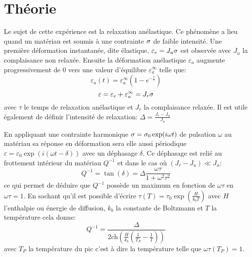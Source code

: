 \section{Théorie}

Le sujet de cette expérience est la relaxation anélastique. Ce phénomène a lieu quand un matériau est soumis à une contrainte $\sigma$ de faible intensité. Une première déformation instantanée, dite élastique, $\varepsilon_e = J_u \sigma$ est observée avec $J_u$ la complaisance non relaxée. Ensuite la déformation anélastique $\varepsilon_a$ augmente progressivement de $0$ vers une valeur d'équilibre $\varepsilon_a^\infty$ telle que:
\begin{equation}
    \varepsilon_a(t) = \varepsilon_a^\infty \left(1-e^{-\frac{t}{\tau}}\right)
\end{equation}
\begin{equation}
    \varepsilon = \varepsilon_e + \varepsilon_a^\infty = J_r \sigma
\end{equation}
avec $\tau$ le temps de relaxation anélastique et $J_r$ la complaisance relaxée. Il est utile également de définir l'intensité de relaxation: $\Delta = \frac{J_r - J_u}{J_u}$

En appliquant une contrainte harmonique $\sigma = \sigma_0 \exp(i\omega t)$ de pulsation $\omega$ au matériau sa réponse en déformation sera elle aussi périodique $\varepsilon = \varepsilon_0\exp(i(\omega t - \delta))$ avec un déphasage $\delta$. Ce déphasage est relié au frottement intérieur du matériau $Q^{-1}$ et dans le cas où $(J_r - J_u) \ll J_u$:
\begin{equation}
    Q^{-1} = \tan(\delta) = \Delta\frac{\omega\tau}{1+\omega^2\tau^2}
\end{equation}
ce qui permet de déduire que $Q^{-1}$ possède un maximum en fonction de $\omega\tau$ en $\omega\tau = 1$. En sachant qu'il est possible d'écrire $\tau(T) = \tau_0 \exp(\frac{H}{k_bT})$ avec $H$ l'enthalpie ou énergie de diffusion, $k_b$ la constante de Boltzmann et $T$ la température cela donne:
\begin{equation}
    Q^{-1} = \frac{\Delta}{2 \mathrm{ch}\left(\frac{H}{k_b}\left(\frac{1}{T_P}-\frac{1}{T}\right)\right)}
    \label{eq:Q_inv_T}
\end{equation}
avec $T_P$ la température du pic c'est à dire la température telle que $\omega\tau(T_P) = 1$.

